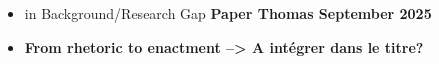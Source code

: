 \begin{itemize}
    \item in Background/Research Gap \textbf{Paper Thomas September 2025}\\
    \item \textbf{From rhetoric to enactment --> A intégrer dans le titre?}
\end{itemize}